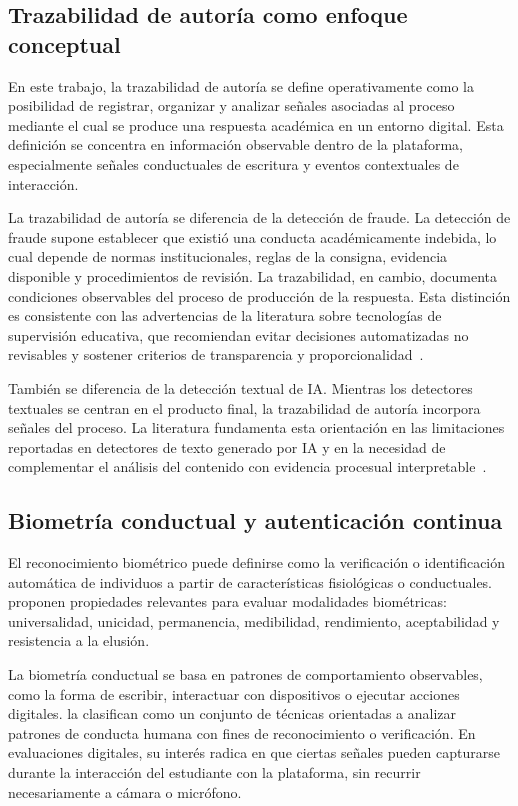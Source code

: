 \subsection{Trazabilidad de autoría como enfoque conceptual}
\label{sec:trazabilidad}

En este trabajo, la trazabilidad de autoría se define operativamente como la posibilidad de registrar, organizar y analizar señales asociadas al proceso mediante el cual se produce una respuesta académica en un entorno digital. Esta definición se concentra en información observable dentro de la plataforma, especialmente señales conductuales de escritura y eventos contextuales de interacción.

La trazabilidad de autoría se diferencia de la detección de fraude. La detección de fraude supone establecer que existió una conducta académicamente indebida, lo cual depende de normas institucionales, reglas de la consigna, evidencia disponible y procedimientos de revisión. La trazabilidad, en cambio, documenta condiciones observables del proceso de producción de la respuesta. Esta distinción es consistente con las advertencias de la literatura sobre tecnologías de supervisión educativa, que recomiendan evitar decisiones automatizadas no revisables y sostener criterios de transparencia y proporcionalidad~\parencite{Mutimukwe2023}.

También se diferencia de la detección textual de IA. Mientras los detectores textuales se centran en el producto final, la trazabilidad de autoría incorpora señales del proceso. La literatura fundamenta esta orientación en las limitaciones reportadas en detectores de texto generado por IA y en la necesidad de complementar el análisis del contenido con evidencia procesual interpretable~\parencite{Liang2023,Krishna2023,Perkins2024}.

\subsection{Biometría conductual y autenticación continua}
\label{sec:biometria_conductual}

El reconocimiento biométrico puede definirse como la verificación o identificación automática de individuos a partir de características fisiológicas o conductuales. \textcite{Jain2004} proponen propiedades relevantes para evaluar modalidades biométricas: universalidad, unicidad, permanencia, medibilidad, rendimiento, aceptabilidad y resistencia a la elusión.

La biometría conductual se basa en patrones de comportamiento observables, como la forma de escribir, interactuar con dispositivos o ejecutar acciones digitales. \textcite{Yampolskiy2008} la clasifican como un conjunto de técnicas orientadas a analizar patrones de conducta humana con fines de reconocimiento o verificación. En evaluaciones digitales, su interés radica en que ciertas señales pueden capturarse durante la interacción del estudiante con la plataforma, sin recurrir necesariamente a cámara o micrófono.

